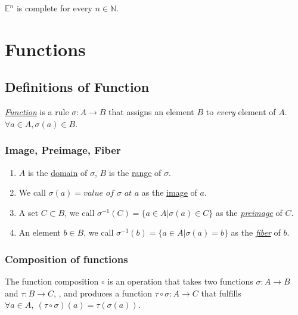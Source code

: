 \documentclass[11pt]{elegantbook}
\begin{document}
\begin{theorem}
    $\mathbb{E}^n$ is complete for every $n \in \mathbb{N}$.
\end{theorem}



\chapter{Functions}
\section{Definitions of Function}
\begin{definition}[Function]
    \normalfont
    \underline{\textit{Function}} is a rule $\sigma:A\rightarrow B$ that assigns an element $B$ to \textit{every} element of $A$. $\forall a\in A, \sigma(a)\in B$.
\end{definition}
\subsection{Image, Preimage, Fiber}
\begin{definition}
    \normalfont
\begin{enumerate}
    \item $A$ is the \underline{domain} of $\sigma$, $B$ is the \underline{range} of $\sigma$.
    \item We call $\sigma (a)= \textit{value of } \sigma\textit{ at } a$ as the \underline{image} of $a$.
    \item A set $C\subset B$, we call $\sigma^{-1}(C)=\{a\in A| \sigma(a)\in C\}$ as the \textit{\underline{preimage}} of $C$.
    \item An element $b\in B$, we call $\sigma^{-1}(b)=\{a\in A| \sigma(a)=b \}$ as the \textit{\underline{fiber}} of $b$.
\end{enumerate}
\end{definition}

\subsection{Composition of functions}
\begin{definition}
\normalfont
The function composition $\circ$ is an operation that takes two functions $\sigma: A\rightarrow B$ and $\tau: B\rightarrow C$, , and produces a function $\tau\circ \sigma:A\rightarrow C$ that fulfills $\forall a\in A,\ (\tau\circ \sigma)(a)=\tau( \sigma(a))$.
\end{definition}
\end{document}
